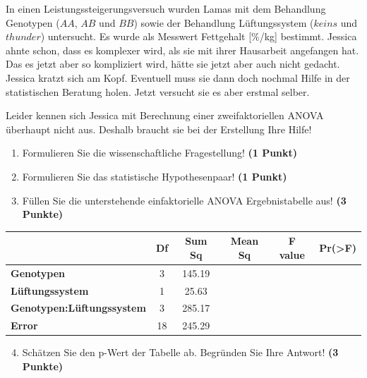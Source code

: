 \documentclass[a4paper, 9pt]{scrartcl}\usepackage[]{graphicx}\usepackage[]{xcolor}
\begin{document}
In einen Leistungssteigerungsversuch wurden Lamas mit dem Behandlung Genotypen ($AA$, $AB$ und $BB$) sowie der Behandlung Lüftungssystem ($keins$ und $thunder$) untersucht. Es wurde als Messwert Fettgehalt [\%/kg] bestimmt. Jessica ahnte schon, dass es komplexer wird, als sie mit ihrer Hausarbeit angefangen hat. Das es jetzt aber so kompliziert wird, hätte sie jetzt aber auch nicht gedacht. Jessica kratzt sich am Kopf. Eventuell muss sie dann doch nochmal Hilfe in der statistischen Beratung holen. Jetzt versucht sie es aber erstmal selber.



\vspace{1ex}

Leider kennen sich Jessica mit Berechnung einer zweifaktoriellen ANOVA überhaupt nicht aus. Deshalb braucht sie bei der Erstellung Ihre Hilfe! 

\begin{enumerate}
  \item Formulieren Sie die wissenschaftliche Fragestellung! \textbf{(1 Punkt)}
  \item Formulieren Sie das statistische Hypothesenpaar! \textbf{(1 Punkt)}
\item Füllen Sie die unterstehende einfaktorielle ANOVA Ergebnistabelle aus! \textbf{(3 Punkte)}
\end{enumerate}

\vspace{1Ex}

\begin{center}
  \Large
  \begin{tabular}{lccccc}
  \toprule
     & \textbf{Df} & \textbf{Sum Sq} & \textbf{Mean Sq} & \textbf{F value} & \textbf{Pr(>F)} \strut\\
    \midrule
   \textbf{Genotypen}  & 3 & 145.19 &  &  &  \strut\\
    \textbf{Lüftungssystem}  & 1 & 25.63 &  &  &  \strut\\
    \textbf{Genotypen:Lüftungssystem}  & 3 & 285.17 &  &  &  \strut\\
   \textbf{Error}  & 18 & 245.29 &  &  &  \strut\\
\bottomrule
  \end{tabular}
\end{center}

\vspace{1Ex}

\begin{enumerate}
  \setcounter{enumi}{3}
\item Schätzen Sie den p-Wert der Tabelle ab. Begründen Sie Ihre
  Antwort! \textbf{(3 Punkte)}
\end{enumerate}
  
\end{document}
